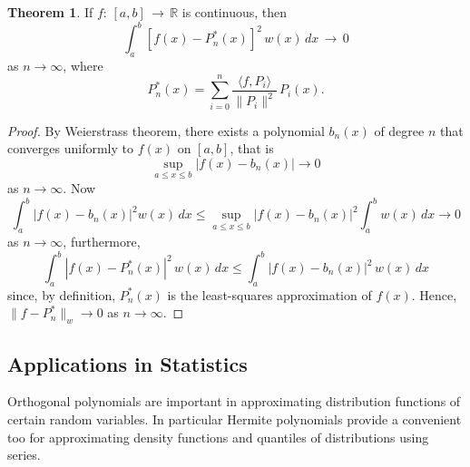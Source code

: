 \documentclass[12pt,a4paper]{report}
\theoremstyle{definition}
\newtheorem{thm}{Theorem}[section]
\theoremstyle{plain}
\begin{document}
\begin{thm}
If $f: \, [a,b]\, \longrightarrow \, \mathbb{R}$ is continuous, then $$\int_a^b\left[f(x) - P^*_n(x)\right]^2\, w(x)\, dx\, \longrightarrow\, 0$$ as $n\longrightarrow \infty$, where $$P^*_n(x) = \sum_{i=0}^n\frac{\langle f,P_i\rangle}{\lVert P_i\rVert^2}\, P_i(x).$$
\end{thm}


\begin{proof}
By Weierstrass theorem, there exists a polynomial $b_n(x)$ of degree $n$ that converges uniformly to $f(x)$ on $[a,b]$, that is$$\sup_{a\leq x\leq b}\left|f(x) - b_n(x)\right| \longrightarrow 0$$ as $n \longrightarrow \infty.$ Now
$$\int_a^b\left|f(x) - b_n(x)\right|^2 w(x)\, dx \leq \sup_{a\leq x\leq b}\left|f(x) - b_n(x)\right|^2\int_a^bw(x)\, dx \longrightarrow 0$$
as $n\longrightarrow \infty$, furthermore,
$$\int_a^b\left|f(x) - P_n^*(x)\right|^2\, w(x)\, dx \leq \int_a^b\left|f(x)-b_n(x)\right|^2\, w(x)\, dx$$
since, by definition, $P^*_n(x)$ is the least-squares approximation of $f(x)$. Hence, $\lVert f - P^*_n\rVert_w \longrightarrow 0$ as $n\longrightarrow \infty$.
\end{proof}



\subsection{Applications in Statistics}
Orthogonal polynomials are important in approximating distribution functions of certain random variables. In particular Hermite polynomials provide a convenient too for approximating density functions and quantiles of distributions using series.
\end{document}
